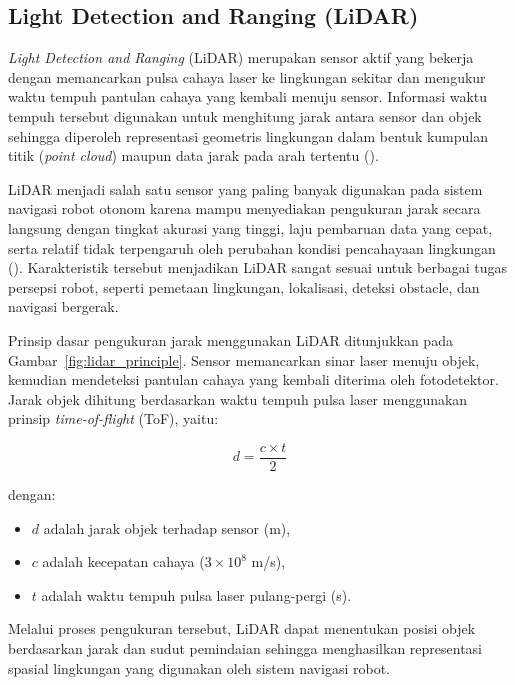 \subsection{Light Detection and Ranging (LiDAR)}

\textit{Light Detection and Ranging} (LiDAR) merupakan sensor aktif yang bekerja dengan memancarkan pulsa cahaya laser ke lingkungan sekitar dan mengukur waktu tempuh pantulan cahaya yang kembali menuju sensor. Informasi waktu tempuh tersebut digunakan untuk menghitung jarak antara sensor dan objek sehingga diperoleh representasi geometris lingkungan dalam bentuk kumpulan titik (\textit{point cloud}) maupun data jarak pada arah tertentu (\cite{Liu2024}).

LiDAR menjadi salah satu sensor yang paling banyak digunakan pada sistem navigasi robot otonom karena mampu menyediakan pengukuran jarak secara langsung dengan tingkat akurasi yang tinggi, laju pembaruan data yang cepat, serta relatif tidak terpengaruh oleh perubahan kondisi pencahayaan lingkungan (\cite{Macenski2022}). Karakteristik tersebut menjadikan LiDAR sangat sesuai untuk berbagai tugas persepsi robot, seperti pemetaan lingkungan, lokalisasi, deteksi obstacle, dan navigasi bergerak.

Prinsip dasar pengukuran jarak menggunakan LiDAR ditunjukkan pada Gambar~\ref{fig:lidar_principle}. Sensor memancarkan sinar laser menuju objek, kemudian mendeteksi pantulan cahaya yang kembali diterima oleh fotodetektor. Jarak objek dihitung berdasarkan waktu tempuh pulsa laser menggunakan prinsip \textit{time-of-flight} (ToF), yaitu:

\begin{equation}
d = \frac{c \times t}{2}
\label{eq:lidar_tof}
\end{equation}

dengan:

\begin{itemize}
\item $d$ adalah jarak objek terhadap sensor (m),
\item $c$ adalah kecepatan cahaya ($3 \times 10^{8}$ m/s),
\item $t$ adalah waktu tempuh pulsa laser pulang-pergi (s).
\end{itemize}

Melalui proses pengukuran tersebut, LiDAR dapat menentukan posisi objek berdasarkan jarak dan sudut pemindaian sehingga menghasilkan representasi spasial lingkungan yang digunakan oleh sistem navigasi robot.

